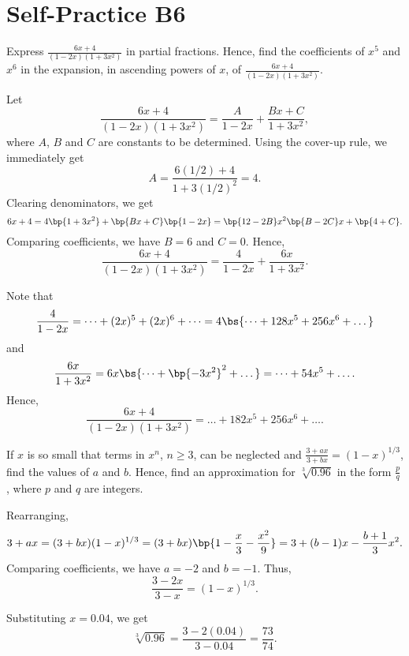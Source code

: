\section{Self-Practice B6}

\begin{problem}
    Express $\frac{6x+4}{(1-2x)(1+3x^{2})}$ in partial fractions. Hence, find the coefficients of $x^{5}$ and $x^{6}$ in the expansion, in ascending powers of $x$, of $\frac{6x+4}{(1-2x)(1+3x^{2})}$.
\end{problem}
\begin{solution}
    Let \[\frac{6x+4}{(1-2x)(1+3x^{2})} = \frac{A}{1-2x} + \frac{Bx + C}{1 + 3x^2},\] where $A$, $B$ and $C$ are constants to be determined. Using the cover-up rule, we immediately get \[A = \frac{6(1/2) + 4}{1 + 3(1/2)^2} = 4.\] Clearing denominators, we get \[6x + 4 = 4\bp{1 + 3x^2} + \bp{Bx + C} \bp{1 - 2x} = \bp{12 - 2B} x^2 \bp{B - 2C} x + \bp{4 + C}.\] Comparing coefficients, we have $B = 6$ and $C = 0$. Hence, \[\frac{6x+4}{(1-2x)(1+3x^{2})} = \frac{4}{1-2x} + \frac{6x}{1 + 3x^2}.\]

    Note that \[\frac{4}{1-2x} = \dots + (2x)^5 + (2x)^6 + \dots = 4\bs{\dots + 128x^5 + 256x^6 + \dots}\] and \[\frac{6x}{1 + 3x^2} = 6x \bs{\dots + \bp{-3x^2}^2 + \dots} = \dots + 54x^5 + \dots.\] Hence, \[\frac{6x+4}{(1-2x)(1+3x^{2})} = \dots + 182x^5 + 256x^6 + \dots.\]
\end{solution}

\begin{problem}
    If $x$ is so small that terms in $x^n$, $n \geq 3$, can be neglected and $\frac{3+ax}{3+bx}=(1-x)^{1/3}$, find the values of $a$ and $b$. Hence, find an approximation for $\sqrt[3]{0.96}$ in the form $\frac{p}{q}$, where $p$ and $q$ are integers.
\end{problem}
\begin{solution}
    Rearranging, \[3 + ax = (3+bx) (1-x)^{1/3} = (3+bx) \bp{1 - \frac{x}{3} - \frac{x^2}{9}} = 3 + (b-1)x - \frac{b+1}{3} x^2.\] Comparing coefficients, we have $a = -2$ and $b = -1$. Thus, \[\frac{3 - 2x}{3 - x} = (1 - x)^{1/3}.\]

    Substituting $x = 0.04$, we get \[\sqrt[3]{0.96} = \frac{3 - 2(0.04)}{3 - 0.04} = \frac{73}{74}.\]
\end{solution}

